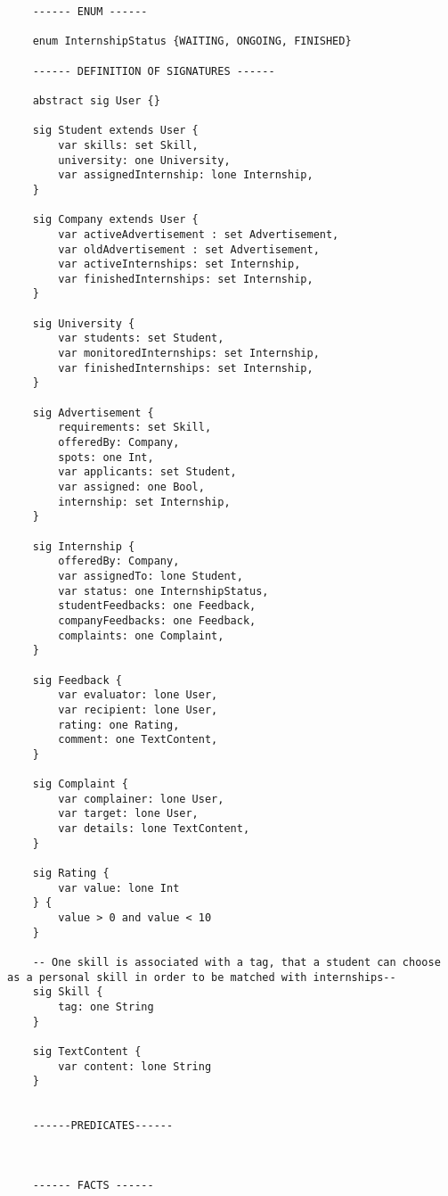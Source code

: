 \begin{lstlisting}
    ------ ENUM ------
    
    enum InternshipStatus {WAITING, ONGOING, FINISHED}
    
    ------ DEFINITION OF SIGNATURES ------
    
    abstract sig User {}
    
    sig Student extends User {
        var skills: set Skill,
        university: one University,
        var assignedInternship: lone Internship,
    }
    
    sig Company extends User {
        var activeAdvertisement : set Advertisement,
        var oldAdvertisement : set Advertisement,
        var activeInternships: set Internship,
        var finishedInternships: set Internship,
    }
    
    sig University {
        var students: set Student,
        var monitoredInternships: set Internship,
        var finishedInternships: set Internship,
    }
    
    sig Advertisement {
        requirements: set Skill,
        offeredBy: Company,
        spots: one Int,
        var applicants: set Student,
        var assigned: one Bool,
        internship: set Internship,
    }
    
    sig Internship {
        offeredBy: Company,
        var assignedTo: lone Student,
        var status: one InternshipStatus,
        studentFeedbacks: one Feedback,
        companyFeedbacks: one Feedback,
        complaints: one Complaint,
    }
    
    sig Feedback {
        var evaluator: lone User,
        var recipient: lone User,
        rating: one Rating,
        comment: one TextContent,
    }
    
    sig Complaint {
        var complainer: lone User,
        var target: lone User,
        var details: lone TextContent,
    }
    
    sig Rating {
        var value: lone Int
    } {
        value > 0 and value < 10
    }
    
    -- One skill is associated with a tag, that a student can choose as a personal skill in order to be matched with internships--
    sig Skill {
        tag: one String
    }
    
    sig TextContent {
        var content: lone String
    }
    
    
    ------PREDICATES------
    
    
    
    ------ FACTS ------
    

\end{lstlisting}
